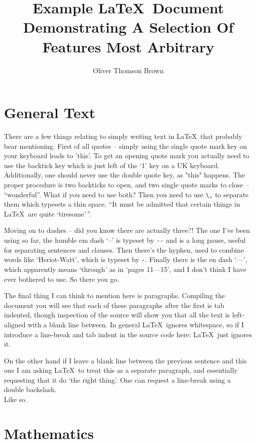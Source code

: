 \documentclass[a4paper,11pt,twoside]{article}		%
\author{Oliver Thomson Brown}
\title{\textbf{Example \LaTeX\ Document} \\ {\Fontamici Demonstrating A Selection Of Features Most Arbitrary}}
\date{}
\begin{document}
\maketitle

\tableofcontents

\section{General Text}
\label{sec:1}

There are a few things relating to simply writing text in \LaTeX\ that probably bear mentioning. First of all quotes -- simply using the single quote mark key on your keyboard leads to 'this'. To get an opening quote mark you actually need to use the backtick key which is just left of the `1' key on a UK keyboard. Additionally, one should never use the double quote key, as "this" happens. The proper procedure is two backticks to open, and two single quote marks to close -- ``wonderful''. What if you need to use both? Then you need to use \verb:\,: to separate them which typesets a thin space. ``It must be admitted that certain things in \LaTeX\ are quite `tiresome'\,''.

Moving on to dashes -- did you know there are actually three?! The one I've been using so far, the humble em dash `--' is typeset by \verb:--: and is a long pause, useful for separating sentences and clauses. Then there's the hyphen, used to combine words like `Heriot-Watt', which is typeset by \verb:-:. Finally there is the en dash `---', which apparently means `through' as in `pages 11---15', and I don't think I have ever bothered to use. So there you go.

The final thing I can think to mention here is paragraphs. Compiling the document you will see that each of these paragraphs after the first is tab indented, though inspection of the source will show you that all the text is left-aligned with a blank line between. In general \LaTeX\ ignores whitespace, so if I introduce a line-break and tab indent in the source code here:
	\LaTeX\ just ignores it.

On the other hand if I leave a blank line between the previous sentence and this one I am asking \LaTeX\ to treat this as a separate paragraph, and essentially requesting that it do `the right thing'. One can request a line-break using a double backslash.\\ Like so. 

\section{Mathematics}
\label{sec:2}
\end{document}
